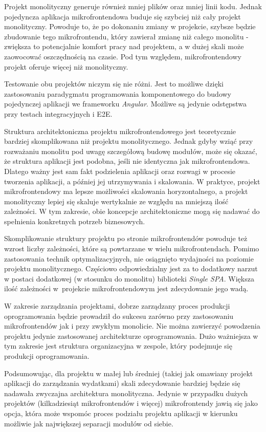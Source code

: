 \documentclass{SGGW-thesis}
\begin{document}
Projekt monolityczny generuje również mniej plików oraz mniej linii kodu. Jednak pojedyncza aplikacja mikrofrontendowa buduje się szybciej niż cały projekt monolityczny. Powoduje to, że po dokonaniu zmiany w projekcie, szybsze będzie zbudowanie tego mikrofrontendu, który zawierał zmianę niż całego monolitu - zwiększa to potencjalnie komfort pracy nad projektem, a w dużej skali może zaowocować oszczędnością na czasie. Pod tym względem, mikrofrontendowy projekt oferuje więcej niż monolityczny.

Testowanie obu projektów niczym się nie różni. Jest to możliwe dzięki zastosowaniu paradygmatu programowania komponentowego do budowy pojedynczej aplikacji we frameworku \textit{Angular}. Możliwe są jedynie odstępstwa przy testach integracyjnych i E2E.

Struktura architektoniczna projektu mikrofrontendowego jest teoretycznie bardziej skomplikowana niż projektu monolitycznego. Jednak gdyby wziąć przy rozważaniu monolitu pod uwagę szczegółową budowę modułów, może się okazać, że struktura aplikacji jest podobna, jeśli nie identyczna jak mikrofrontendowa. Dlatego ważny jest sam fakt podzielenia aplikacji oraz rozwagi w procesie tworzenia aplikacji, a później jej utrzymywania i skalowania. W praktyce, projekt mikrofrontendowy ma lepsze możliwości skalowania horyzontalnego, a projekt monolityczny lepiej się skaluje wertykalnie ze względu na mniejszą ilość zależności. W tym zakresie, obie koncepcje architektoniczne mogą się nadawać do spełnienia konkretnych potrzeb biznesowych.

Skomplikowanie struktury projektu po stronie mikrofrontendów powoduje też wzrost liczby zależności, które są powtarzane w wielu mikrofrontendach. Pomimo zastosowania technik optymalizacyjnych, nie osiągnięto wydajności na poziomie projektu monolitycznego. Częściowo odpowiedzialny jest za to dodatkowy narzut w postaci dodatkowej (w stosunku do monolitu) biblioteki \textit{Single SPA}. Większa ilość zależności w~projekcie mikrofrontendowym jest zdecydowanie jego wadą.

W zakresie zarządzania projektami, dobrze zarządzany proces produkcji oprogramowania będzie prowadził do sukcesu zarówno przy zastosowaniu mikrofrontendów jak i przy zwykłym monolicie. Nie można zawierzyć powodzenia projektu jedynie zastosowanej architekturze oprogramowania. Dużo ważniejsza w tym zakresie jest struktura organizacyjna w zespole, który podejmuje się produkcji oprogramowania.

Podsumowując, dla projektu w małej lub średniej (takiej jak omawiany projekt aplikacji do zarządzania wydatkami) skali zdecydowanie bardziej będzie się nadawała zwyczajna architektura monolityczna. Jedynie w przypadku dużych projektów (kilkadziesiąt mikrofrontendów i więcej) mikrofrontendy jawią się jako opcja, która może wspomóc proces podziału projektu aplikacji w kierunku możliwie jak największej separacji modułów od siebie.



\printbibliography[heading=bibnumbered,title={Bibliografia}]



\beforelastpage
\end{document}
